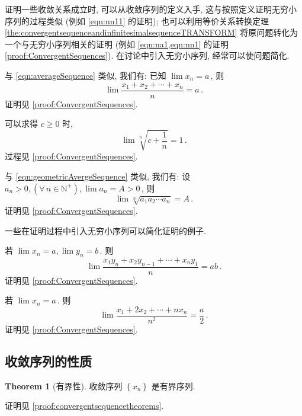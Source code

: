 \documentclass{book}
\newcommand{\Any}{\forall\,}
\newcommand{\set}[1]{\left\{#1\right\}}
\newcommand{\N}{\mathbb{N}}
\renewcommand{\ge}{\geqslant}
\numberwithin{equation}{section}
\numberwithin{figure}{section}
\theoremstyle{definition}
\newtheorem{theorem}{Theorem}[section]
\begin{document}
证明一些收敛关系成立时, 可以从收敛序列的定义入手, 这与按照定义证明无穷小序列的过程类似 (例如 \cref{eqn:nn11} 的证明); 也可以利用等价关系转换定理 \ref{the:convergentsequenceandinfinitesimalsequenceTRANSFORM} 将原问题转化为一个与无穷小序列相关的证明 (例如 \cref{eqn:na1,eqn:nn1} 的证明 \cref{proof:ConvergentSequences}). 在讨论中引入无穷小序列, 经常可以使问题简化.

与 \cref{eqn:averageSequence} 类似, 我们有: 已知 $\lim x_n=a$\,, 则
\begin{equation*}
  \lim\frac{x_1+x_2+\cdots+x_n}{n}=a\,.
\end{equation*}
证明见 \cref{proof:ConvergentSequences}.

可以求得 $c\ge0$ 时,
\begin{equation*}
  \lim\sqrt[n]{c+\frac{1}{n}}=1\,.
\end{equation*}
过程见 \cref{proof:ConvergentSequences}.

与 \cref{eqn:geometricAvergeSequence} 类似, 我们有: 设 $a_n>0,(\Any n\in\N^+),\lim a_n=A>0$\,, 则
\begin{equation*}
  \lim\sqrt[n]{a_1a_2\cdots a_n}=A\,.
\end{equation*}
证明见 \cref{proof:ConvergentSequences}.

一些在证明过程中引入无穷小序列可以简化证明的例子.

若 $\lim x_n=a,\lim y_n=b$\,. 则
\begin{equation*}
  \lim \frac{x_1y_n+x_2y_{n-1}+\cdots+x_ny_1}{n}=ab\,.
\end{equation*}
证明见 \cref{proof:ConvergentSequences}.

若 $\lim x_n=a$\,. 则
\begin{equation*}
  \lim\frac{x_1+2x_2+\cdots+nx_n}{n^2}=\frac{a}{2}\,.
\end{equation*}
证明见 \cref{proof:ConvergentSequences}.

\subsection{收敛序列的性质}
\begin{theorem}[有界性]
  收敛序列 $\set{x_n}$ 是有界序列.
  \label{the:ConvergentSequencehaveboundary}
\end{theorem}
证明见 \cref{proof:convergentsequencetheorems}.
\end{document}
